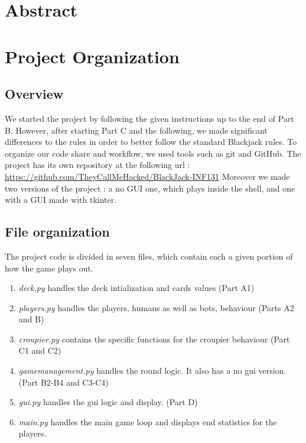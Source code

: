 \documentclass[a4paper, twoside]{report}
\begin{document}
    \lipsum[1]

\clearpage

{ \hypersetup{hidelinks} \tableofcontents {} }

\setcounter{page}{1}
\chapter*{Abstract}
\label{chap:abstract}
    \lipsum[1-2]

\chapter{Project Organization}

    \section{Overview}
        \par
        We started the project by following the given instructions up to the end of Part B. 
        However, after starting Part C and the following, we made significant differences to the rules in order to better 
        follow the standard Blackjack rules.
        To organize our code share and workflow, we used tools such as git and GitHub.\linebreak
        The project has its own repository at the following url : \linebreak
        \url{https://github.com/TheyCallMeHacked/BlackJack-INF131}
        \linebreak
        Moreover we made two versions of the project : a no GUI one, which plays inside the shell, and one with a GUI made with tkinter.
    \section{File organization}
        \par
        The project code is divided in seven files, which contain each a given portion of how the game plays out. 
        \begin{enumerate}
            \item \textit{deck.py} handles the deck intialization and cards values (Part A1)
            \item \textit{players.py} handles the players, humans as well as bots, behaviour (Parts A2 and B)
            \item \textit{croupier.py} contains the specific functions for the croupier behaviour (Part C1 and C2)
            \item \textit{gamemanagement.py} handles the round logic. It also has a no gui version. (Part B2-B4 and C3-C4) 
            \item \textit{gui.py} handles the gui logic and display. (Part D)
            \item \textit{main.py} handles the main game loop and displays end statistics for the players.
        \end{enumerate}
\end{document}
